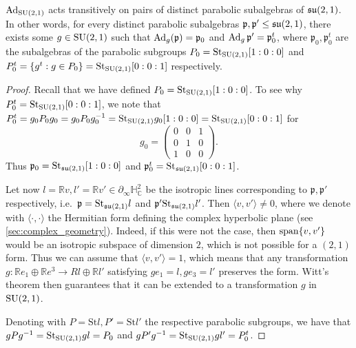 \documentclass{report}
\begin{document}
\begin{lemma}\label{lem:adjoint_parabolic}
    $\operatorname{Ad}_{\operatorname{{\mathrm{SU}}}(2,1)}$ acts transitively on pairs of distinct parabolic subalgebras of $\operatorname{{\mathfrak{su}}}(2,1)$.
    In other words, for every distinct parabolic subalgebras $\mathfrak p, \mathfrak p' \leq \operatorname{{\mathfrak{su}}}(2,1)$, there exists some $g \in \operatorname{{\mathrm{SU}}}(2,1)$ such that $\operatorname{Ad}_g(\mathfrak p) = \mathfrak p_0$ and $\operatorname{Ad}_g \mathfrak p' = \mathfrak p_0^t$, where $\mathfrak p_0,  \mathfrak p_0^t$ are the subalgebras of the parabolic subgroups $P_0 = \mathrm{St}_{\operatorname{{\mathrm{SU}}}(2,1)} [1:0:0]$ and $P_0^t = \left\{ g^t : g \in P_0 \right\} = \mathrm{St}_{\operatorname{{\mathrm{SU}}}(2,1)} [0:0:1]$ respectively.
\end{lemma}
\begin{proof}
    Recall that we have defined $P_0 = \mathrm{St}_{\operatorname{{\mathrm{SU}}}(2,1)}[1:0:0]$.
    To see why $P_0^t = \mathrm{St}_{\operatorname{{\mathrm{SU}}}(2,1)}[0:0:1]$, we note that $P_0^t = g_0 P_0 g_0 = g_0 P_0 g_0^{-1} = \mathrm{St}_{\operatorname{{\mathrm{SU}}}(2,1)} g_0 [1:0:0] = \mathrm{St}_{\operatorname{{\mathrm{SU}}}(2,1)} [0:0:1]$ for
    \[
    g_0 = \begin{pmatrix} 0 & 0 & 1 \\ 0 & 1 & 0 \\ 1 & 0 & 0 \end{pmatrix}.
    \]
    Thus $\mathfrak p_0 = \mathrm{St}_{\operatorname{{\mathfrak{su}}}(2,1)}[1:0:0]$ and $\mathfrak p_0^t = \mathrm{St}_{\operatorname{{\mathfrak{su}}}(2,1)}[0:0:1]$.
    
    Let now $l = \mathbb Rv, l' = \mathbb Rv' \in \partial_\infty \mathbb H^2_\mathbb C$ be the isotropic lines corresponding to $\mathfrak p, \mathfrak p'$ respectively, i.e.\ $\mathfrak p = \mathrm{St}_{\operatorname{{\mathfrak{su}}}(2,1)}l$ and $\mathfrak p' \mathrm{St}_{\operatorname{{\mathfrak{su}}}(2,1)}l'$.
    Then $\langle v, v' \rangle \neq 0$, where we denote with $\langle \cdot, \cdot \rangle$ the Hermitian form defining the complex hyperbolic plane (see \cref{sec:complex_geometry}).
    Indeed, if this were not the case, then $\operatorname{span} \{v, v' \}$ would be an isotropic subspace of dimension $2$, which is not possible for a $(2,1)$ form.
    Thus we can assume that $\langle v, v' \rangle = 1$, which means that any transformation $g: \mathbb R e_1 \oplus \mathbb Re^3 \to R l \oplus \mathbb Rl'$ satisfying $g e_1 = l, ge_3 = l'$ preserves the form.
    Witt's theorem then guarantees that it can be extended to a transformation $g$ in $\operatorname{{\mathrm{SU}}}(2,1)$.

    Denoting with $P = \mathrm{St}l, P' = \mathrm{St}l'$ the respective parabolic subgroups, we have that $g P g^{-1} = \mathrm{St}_{\operatorname{{\mathrm{SU}}}(2,1)}gl = P_0$ and $g P' g^{-1} = \mathrm{St}_{\operatorname{{\mathrm{SU}}}(2,1)}gl' = P_0^t$.
\end{proof}
\end{document}
